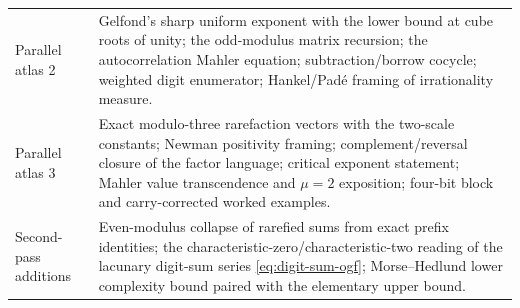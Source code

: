 \documentclass[11pt,oneside]{article}
\numberwithin{equation}{section}
\theoremstyle{definition}
\theoremstyle{remark}
\begin{document}
\begin{longtable}{@{}p{}p{}@{}}
Parallel atlas 2 & Gelfond's sharp uniform exponent with the lower bound at cube roots of unity; the odd-modulus matrix recursion; the autocorrelation Mahler equation; subtraction/borrow cocycle; weighted digit enumerator; Hankel/Pad\'e framing of irrationality measure. \\
Parallel atlas 3 & Exact modulo-three rarefaction vectors with the two-scale constants; Newman positivity framing; complement/reversal closure of the factor language; critical exponent statement; Mahler value transcendence and \(\mu=2\) exposition; four-bit block and carry-corrected worked examples. \\
Second-pass additions & Even-modulus collapse of rarefied sums from exact prefix identities; the characteristic-zero/characteristic-two reading of the lacunary digit-sum series \eqref{eq:digit-sum-ogf}; Morse--Hedlund lower complexity bound paired with the elementary upper bound. \\
\bottomrule
\end{longtable}
\renewcommand{\arraystretch}{1}
\end{document}
